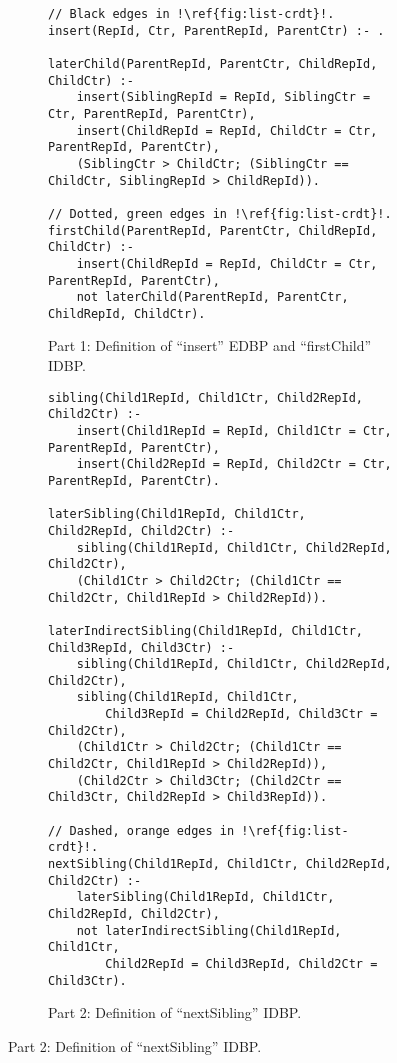 \begin{figure}[htpb]
	\centering

	\begin{subfigure}[b]{\textwidth}
		\begin{lstlisting}[keepspaces,escapechar=!]
// Black edges in !\ref{fig:list-crdt}!.
insert(RepId, Ctr, ParentRepId, ParentCtr) :- .

laterChild(ParentRepId, ParentCtr, ChildRepId, ChildCtr) :-
    insert(SiblingRepId = RepId, SiblingCtr = Ctr, ParentRepId, ParentCtr),
    insert(ChildRepId = RepId, ChildCtr = Ctr, ParentRepId, ParentCtr),
    (SiblingCtr > ChildCtr; (SiblingCtr == ChildCtr, SiblingRepId > ChildRepId)).

// Dotted, green edges in !\ref{fig:list-crdt}!.
firstChild(ParentRepId, ParentCtr, ChildRepId, ChildCtr) :-
    insert(ChildRepId = RepId, ChildCtr = Ctr, ParentRepId, ParentCtr),
    not laterChild(ParentRepId, ParentCtr, ChildRepId, ChildCtr).\end{lstlisting}
		\caption{Part 1: Definition of ``insert'' \ac{EDBP} and ``firstChild'' \ac{IDBP}.}\label{code:list-crdt-datalog-dialect-part1}
	\end{subfigure}

	\vspace{1em}

	\begin{subfigure}[b]{\textwidth}
		\begin{lstlisting}[keepspaces,escapechar=!]
sibling(Child1RepId, Child1Ctr, Child2RepId, Child2Ctr) :-
    insert(Child1RepId = RepId, Child1Ctr = Ctr, ParentRepId, ParentCtr),
    insert(Child2RepId = RepId, Child2Ctr = Ctr, ParentRepId, ParentCtr).

laterSibling(Child1RepId, Child1Ctr, Child2RepId, Child2Ctr) :-
    sibling(Child1RepId, Child1Ctr, Child2RepId, Child2Ctr),
    (Child1Ctr > Child2Ctr; (Child1Ctr == Child2Ctr, Child1RepId > Child2RepId)).

laterIndirectSibling(Child1RepId, Child1Ctr, Child3RepId, Child3Ctr) :-
    sibling(Child1RepId, Child1Ctr, Child2RepId, Child2Ctr),
    sibling(Child1RepId, Child1Ctr,
        Child3RepId = Child2RepId, Child3Ctr = Child2Ctr),
    (Child1Ctr > Child2Ctr; (Child1Ctr == Child2Ctr, Child1RepId > Child2RepId)),
    (Child2Ctr > Child3Ctr; (Child2Ctr == Child3Ctr, Child2RepId > Child3RepId)).

// Dashed, orange edges in !\ref{fig:list-crdt}!.
nextSibling(Child1RepId, Child1Ctr, Child2RepId, Child2Ctr) :-
    laterSibling(Child1RepId, Child1Ctr, Child2RepId, Child2Ctr),
    not laterIndirectSibling(Child1RepId, Child1Ctr,
        Child2RepId = Child3RepId, Child2Ctr = Child3Ctr).\end{lstlisting}
		\caption{Part 2: Definition of ``nextSibling'' \ac{IDBP}.}\label{code:list-crdt-datalog-dialect-part2}
	\end{subfigure}
\end{figure}

